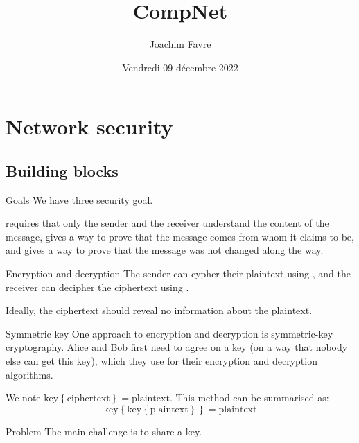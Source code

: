 \documentclass[a4paper]{article}
\title{CompNet}
\author{Joachim Favre}
\date{Vendredi 09 décembre 2022}
\begin{document}
\maketitle


\section{Network security}
\subsection{Building blocks}

\begin{parag}{Goals}
    We have three security goal. 

     requires that only the sender and the receiver understand the content of the message,  gives a way to prove that the message comes from whom it claims to be, and  gives a way to prove that the message was not changed along the way.
\end{parag}

\begin{parag}{Encryption and decryption}
    The sender can cypher their plaintext using , and the receiver can decipher the ciphertext using .

    Ideally, the ciphertext should reveal no information about the plaintext.
\end{parag}

\begin{parag}{Symmetric key}
    One approach to encryption and decryption is symmetric-key cryptography. Alice and Bob first need to agree on a key (on a way that nobody else can get this key), which they use for their encryption and decryption algorithms.

    We note $\text{key}\left\{\text{ciphertext}\right\} = \text{plaintext}$. This method can be summarised as:
    \[\text{key}\left\{\text{key}\left\{\text{plaintext}\right\}\right\} = \text{plaintext}\]

    \begin{subparag}{Problem}
        The main challenge is to share a key. 
    \end{subparag}
\end{parag}
\end{document}
